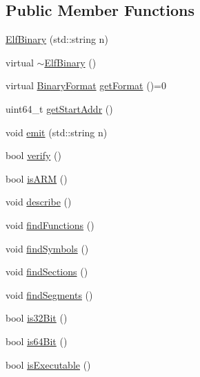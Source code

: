 \subsection*{\-Public \-Member \-Functions}
\begin{DoxyCompactItemize}
\item 
\hyperlink{class_e_p_a_x_1_1_elf_1_1_elf_binary_aea424db302d99d3330aa5c6331834a45}{\-Elf\-Binary} (std\-::string n)
\item 
virtual \hyperlink{class_e_p_a_x_1_1_elf_1_1_elf_binary_ab7e61b25803a678994e693ce134c9389}{$\sim$\-Elf\-Binary} ()
\item 
virtual \hyperlink{namespace_e_p_a_x_a4be639c006ef14def4708b37ee6dd67d}{\-Binary\-Format} \hyperlink{class_e_p_a_x_1_1_elf_1_1_elf_binary_a2f8cfe8d4567e4aefbeb0717da3f0e9c}{get\-Format} ()=0
\item 
uint64\-\_\-t \hyperlink{class_e_p_a_x_1_1_elf_1_1_elf_binary_af4d56ab5e4f25b17f236c1712dd7c2bb}{get\-Start\-Addr} ()
\item 
void \hyperlink{class_e_p_a_x_1_1_elf_1_1_elf_binary_ac929a0c398ce61c8ac80df79dbb6a1d9}{emit} (std\-::string n)
\item 
bool \hyperlink{class_e_p_a_x_1_1_elf_1_1_elf_binary_a9955c801d73bcc62ce60a884f4d36464}{verify} ()
\item 
bool \hyperlink{class_e_p_a_x_1_1_elf_1_1_elf_binary_a48ca78d2f324eef54c478532d1d38636}{is\-A\-R\-M} ()
\item 
void \hyperlink{class_e_p_a_x_1_1_elf_1_1_elf_binary_aa6846ae0eedb4620e26e3b466efec629}{describe} ()
\item 
void \hyperlink{class_e_p_a_x_1_1_elf_1_1_elf_binary_a57b3bc6b92a7964835e424d610523240}{find\-Functions} ()
\item 
void \hyperlink{class_e_p_a_x_1_1_elf_1_1_elf_binary_a393e4e2eeea3224d1b61c6a8412c9da5}{find\-Symbols} ()
\item 
void \hyperlink{class_e_p_a_x_1_1_elf_1_1_elf_binary_ad4a57cb23543cb8b37d9b4fa61f07a0c}{find\-Sections} ()
\item 
void \hyperlink{class_e_p_a_x_1_1_elf_1_1_elf_binary_ae357dea8fe42fff9b8ae321dc94b0503}{find\-Segments} ()
\item 
bool \hyperlink{class_e_p_a_x_1_1_elf_1_1_elf_binary_a813a2985bd91b6e7640a2221235fdb4e}{is32\-Bit} ()
\item 
bool \hyperlink{class_e_p_a_x_1_1_elf_1_1_elf_binary_a07de5ed756446ede40d3f1328eedfa0b}{is64\-Bit} ()
\item 
bool \hyperlink{class_e_p_a_x_1_1_elf_1_1_elf_binary_a683bf66639d6fb4c4d9e9904a563494e}{is\-Executable} ()

\end{DoxyCompactItemize}
